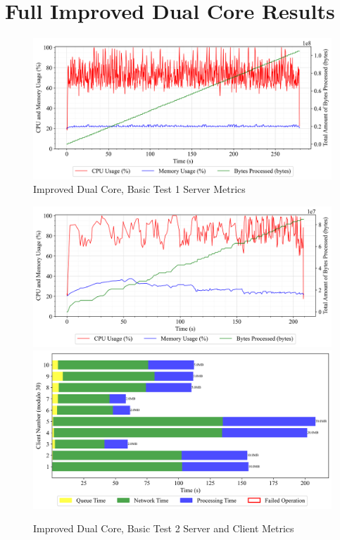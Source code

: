\section{Full Improved Dual Core Results}
\begin{figure}[h!t]
    \begin{center}
    \label{Fig:A1.17}
    \caption{Improved Dual Core, Basic Test 1 Server Metrics}
    \includegraphics[width=\x\textwidth]{Chapter4/Results/2c_improved_results/arty-a7-2c-improved_basic_1_20241007_121858.db_server_metrics.png}
    \end{center}
\end{figure}

\begin{figure}[h!t]
    \begin{center}
    \label{Fig:A1.18}
    \caption{Improved Dual Core, Basic Test 2 Server and Client Metrics}
    \includegraphics[width=\x\textwidth]{Chapter4/Results/2c_improved_results/arty-a7-2c-improved_basic_2_20241007_122337.db_server_metrics.png}
    \includegraphics[width=\x\textwidth]{Chapter4/Results/2c_improved_results/arty-a7-2c-improved_basic_2_20241007_122337.db_client_tasks.png}
    \end{center}
\end{figure}

